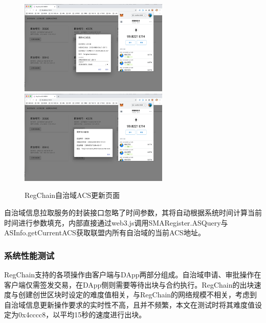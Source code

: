       \begin{figure}[H]
        \centering
        {\includegraphics[height=4.5cm]{figures/regchain_client_update_1.png}}
        \hspace{1em}
        {\includegraphics[height=4.5cm]{figures/regchain_client_update_2.png}}
        \caption{RegChain自治域ACS更新页面}
        \label{fig:regchain_client_update}
      \end{figure}

      自治域信息拉取服务的封装接口忽略了时间参数，其将自动根据系统时间计算当前时间进行参数填充，内部直接通过web3.js调用SMARegister.ASQuery与ASInfo.getCurrentACS获取联盟内所有自治域的当前ACS地址。

      \subsubsection{系统性能测试}
      \label{IPv6_Security:interas:implement:test}

      RegChain支持的各项操作由客户端与DApp两部分组成。自治域申请、审批操作在客户端仅需签发交易，在DApp侧则需要等待出块与合约执行。RegChain的出块速度与创建创世区块时设定的难度值相关，与RegChain的网络规模不相关，考虑到自治域信息更新操作要求的实时性不高，且并不频繁，本文在测试时将其难度值设定为0x4cccc8，以平均15秒的速度进行出块。


